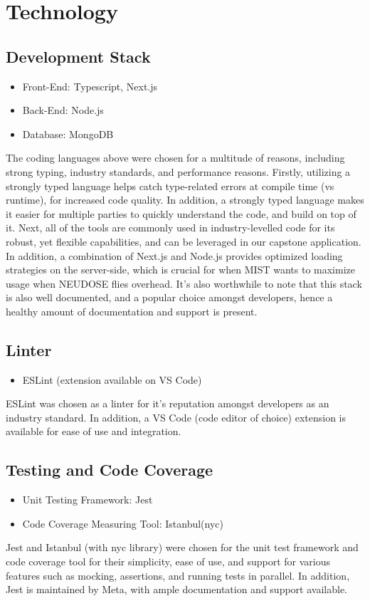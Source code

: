 \documentclass{article}
\begin{document}
\section{Technology}

\subsection{Development Stack}
\begin{itemize}
\item Front-End: Typescript, Next.js
\item Back-End: Node.js
\item Database: MongoDB
\end{itemize}
The coding languages above were chosen for a multitude of reasons, including strong typing, industry standards, and performance reasons. Firstly, utilizing a strongly typed language helps catch type-related errors at compile time (vs runtime), for increased code quality. In addition, a strongly typed language makes it easier for multiple parties to quickly understand the code, and build on top of it. Next, all of the tools are commonly used in industry-levelled code for its robust, yet flexible capabilities, and can be leveraged in our capstone application. In addition, a combination of Next.js and Node.js provides optimized loading strategies on the server-side, which is crucial for when MIST wants to maximize usage when NEUDOSE flies overhead. It’s also worthwhile to note that this stack is also well documented, and a popular choice amongst developers, hence a healthy amount of documentation and support is present.

\subsection{Linter}
\begin{itemize}
\item ESLint (extension available on VS Code)
\end{itemize}
ESLint was chosen as a linter for it’s reputation amongst developers as an industry standard. In addition, a VS Code (code editor of choice) extension is available for ease of use and integration.

\subsection{Testing and Code Coverage}
\begin{itemize}
\item Unit Testing Framework: Jest
\item Code Coverage Measuring Tool: Istanbul(nyc)
\end{itemize}
Jest and Istanbul (with nyc library) were chosen for the unit test framework and code coverage tool for their simplicity, ease of use, and support for various features such as mocking, assertions, and running tests in parallel. In addition, Jest is maintained by Meta, with ample documentation and support available.
\end{document}
